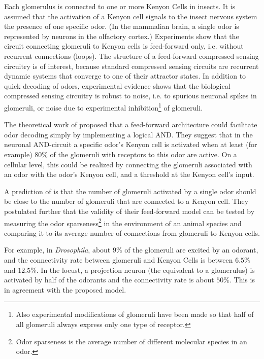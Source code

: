 Each glomerulus is connected to one or more Kenyon Cells in insects.
It is assumed that the activation of a Kenyon cell signals to the
insect nervous system the presence of one specific odor. (In the mammalian
brain, a single odor is represented by neurons in the olfactory cortex.)
Experiments show that the circuit connecting glomeruli to Kenyon cells
is feed-forward only, i.e. without
recurrent connections (loops). The structure of a feed-forward compressed
sensing circuitry is of interest, because standard compressed sensing
circuits are recurrent dynamic systems that converge to one of their
attractor states. In addition to quick decoding of odors, experimental
evidence shows that the biological compressed sensing circuitry is
robust to noise, i.e. to spurious neuronal spikes in glomeruli, or
noise due to experimental inhibition\footnote{Also experimental modifications of glomeruli have been made so that
half of all glomeruli always express only one type of receptor.} of glomeruli.

The theoretical work of \cite{ZhangSharpee2016} proposed that a feed-forward
architecture could facilitate odor decoding simply by implementing
a logical AND. They suggest that in the neuronal AND-circuit a specific
odor's Kenyon cell is activated when at least (for example) $80\%$
of the glomeruli with receptors to this odor are active. On a cellular
level, this could be realized by connecting the glomeruli associated
with an odor with the odor's Kenyon cell, and a threshold at the Kenyon
cell's input.

A prediction of \cite{ZhangSharpee2016} is that the number of glomeruli
activated by a single odor should be close to the number of glomeruli
that are connected to a Kenyon cell. They postulated further that
the validity of their feed-forward model can be tested by measuring
the odor sparseness\footnote{Odor sparseness is the average number of different molecular species
in an odor.} in the environment of an animal species and comparing it to its average
number of connections from glomeruli to Kenyon cells.

For example, in \emph{Drosophila}, about $9\%$ of the glomeruli are
excited by an odorant, and the connectivity rate between glomeruli
and Kenyon Cells is between $6.5\%$ and $12.5\%$. In the locust,
a projection neuron (the equivalent to a glomerulus) is activated
by half of the odorants and the connectivity rate is about $50\%$.
This is in agreement with the proposed model.

